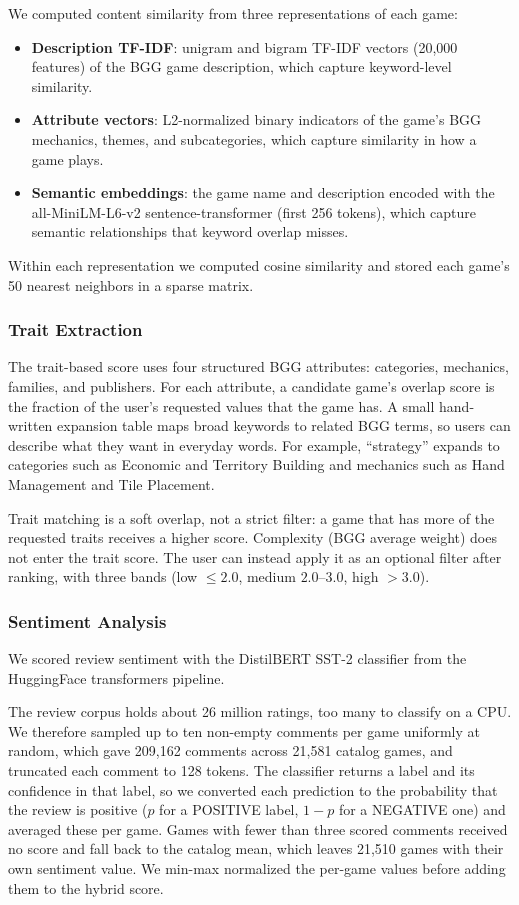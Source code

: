 \documentclass[conference]{IEEEtran}
\begin{document}
We computed content similarity from three representations of each game:
\begin{itemize}
    \item \textbf{Description TF-IDF}: unigram and bigram TF-IDF vectors (20,000 features) of the BGG game description, which capture keyword-level similarity.
    \item \textbf{Attribute vectors}: L2-normalized binary indicators of the game's BGG mechanics, themes, and subcategories, which capture similarity in how a game plays.
    \item \textbf{Semantic embeddings}: the game name and description encoded with the all-MiniLM-L6-v2 sentence-transformer (first 256 tokens), which capture semantic relationships that keyword overlap misses.
\end{itemize}
Within each representation we computed cosine similarity and stored each game's 50 nearest neighbors in a sparse matrix.

\subsubsection{Trait Extraction}

The trait-based score uses four structured BGG attributes: categories, mechanics, families, and publishers. For each attribute, a candidate game's overlap score is the fraction of the user's requested values that the game has. A small hand-written expansion table maps broad keywords to related BGG terms, so users can describe what they want in everyday words. For example, ``strategy'' expands to categories such as Economic and Territory Building and mechanics such as Hand Management and Tile Placement.

Trait matching is a soft overlap, not a strict filter: a game that has more of the requested traits receives a higher score. Complexity (BGG average weight) does not enter the trait score. The user can instead apply it as an optional filter after ranking, with three bands (low $\le 2.0$, medium $2.0$--$3.0$, high $> 3.0$).

\subsubsection{Sentiment Analysis}

We scored review sentiment with the DistilBERT SST-2 classifier from the HuggingFace transformers pipeline.

The review corpus holds about 26 million ratings, too many to classify on a CPU. We therefore sampled up to ten non-empty comments per game uniformly at random, which gave 209,162 comments across 21,581 catalog games, and truncated each comment to 128 tokens. The classifier returns a label and its confidence in that label, so we converted each prediction to the probability that the review is positive ($p$ for a POSITIVE label, $1-p$ for a NEGATIVE one) and averaged these per game. Games with fewer than three scored comments received no score and fall back to the catalog mean, which leaves 21,510 games with their own sentiment value. We min-max normalized the per-game values before adding them to the hybrid score.
\end{document}
